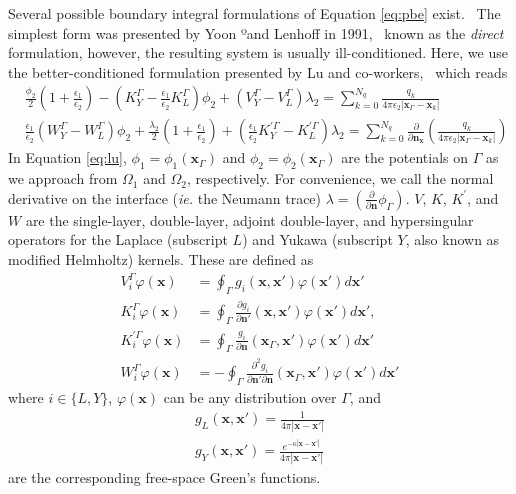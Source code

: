 Several possible boundary integral formulations of Equation \eqref{eq:pbe} exist.~\cite{search2022towards} The simplest form was presented by Yoon ºand Lenhoff in 1991,~\cite{YoonLenhoff1990} known as the \emph{direct} formulation, however, the resulting system is usually ill-conditioned. Here, we use the better-conditioned formulation presented by Lu and co-workers,~\cite{LuETal2006,LuETal2009,debuhr2016dashmm} which reads
%
\begin{align}\label{eq:lu}
    & \tfrac{\phi_2}{2}\left(1+\tfrac{\epsilon_1}{\epsilon_2}\right) - \left(K_Y^\Gamma - \tfrac{\epsilon_1}{\epsilon_2}K_L^\Gamma\right)\phi_2 + \left(V_Y^\Gamma - V_L^\Gamma\right)\lambda_2 = \sum_{k=0}^{N_q}  \frac{q_k}{4\pi\epsilon_2|\mathbf{x}_{\Gamma} - \mathbf{x}_k|}
     \nonumber \\
    &\tfrac{\epsilon_1}{\epsilon_2}\left(W_Y^\Gamma - W_L^\Gamma\right)\phi_2 +  \tfrac{\lambda_2}{2}\left(1+\tfrac{\epsilon_1}{\epsilon_2}\right) + \left(\tfrac{\epsilon_1}{\epsilon_2}K_Y^{\prime\Gamma} - K_L^{\prime\Gamma}\right)\lambda_2 = \sum_{k=0}^{N_q}  \frac{\partial}{\partial\mathbf{n}_\mathbf{x}}\left(\frac{q_k}{4\pi\epsilon_2|\mathbf{x}_{\Gamma} - \mathbf{x}_k|}\right)
\end{align}
%
In Equation \eqref{eq:lu}, $\phi_1 = \phi_1(\mathbf{x}_\Gamma)$ and $\phi_2 = \phi_2(\mathbf{x}_\Gamma)$ are the potentials on $\Gamma$ as we approach from $\Omega_1$ and $\Omega_2$, respectively. For convenience, we call the normal derivative on the interface ({\it ie.} the Neumann trace) $\lambda=\left(\frac{\partial}{\partial \mathbf{n}}  \phi_{\Gamma}  \right)$. $V$, $K$, $K^{\prime}$, and $W$ are the single-layer, double-layer, adjoint double-layer, and hypersingular operators for the Laplace (subscript $L$) and Yukawa (subscript $Y$, also known as modified Helmholtz) kernels. These are defined %
as
%
\begin{align}\label{eq:all_op}
V_i^\Gamma \varphi (\mathbf{x}) &= \oint_\Gamma g_i(\mathbf{x},\mathbf{x}')\varphi(\mathbf{x}')d\mathbf{x}'\nonumber\\
K_i^\Gamma \varphi (\mathbf{x}) &= \oint_\Gamma \frac{\partial g_i}{\partial\mathbf{n}'}(\mathbf{x},\mathbf{x}')\varphi(\mathbf{x}')d\mathbf{x}',\nonumber\\
K^{\prime\Gamma}_i\varphi (\mathbf{x}) &= \oint_\Gamma \frac{g_i}{\partial\mathbf{n}}(\mathbf{x}_\Gamma,\mathbf{x}')\varphi(\mathbf{x}')d\mathbf{x}'\nonumber\\
W^\Gamma_i\varphi (\mathbf{x}) &= - \oint_\Gamma \frac{\partial^2 g_i}{\partial\mathbf{n}'\partial\mathbf{n}}(\mathbf{x}_\Gamma,\mathbf{x}')\varphi(\mathbf{x}')d\mathbf{x}'
\end{align}
%
where $i \in \{L,Y\}$, $\varphi(\mathbf{x})$ can be any distribution over $\Gamma$, and %
\begin{align}\label{eq:green_func}
g_L(\mathbf{x},\mathbf{x}')=\frac{1}{4\pi|\mathbf{x}-\mathbf{x}'|} \nonumber \\
g_Y(\mathbf{x},\mathbf{x}')=\frac{e^{-\kappa|\mathbf{x}-\mathbf{x}'|}}{4\pi|\mathbf{x}-\mathbf{x}'|}
\end{align}
are the corresponding free-space Green's functions.

